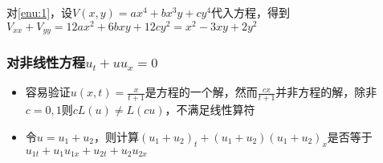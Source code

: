 对\ref{enu:1}，设\(V(x,y)=ax^4+bx^3y+cy^4\)代入方程，得到\(V_{xx}+V_{yy}=12ax^2+6bxy+12cy^2=x^2-3xy+2y^2\)

\subsubsection{对非线性方程\(u_t+uu_x=0\)}
\begin{itemize}
	\item 容易验证\(u(x,t)=\frac{x}{t+1}\)是方程的一个解，然而\(\frac{cx}{t+1}\)并非方程的解，除非\(c=0,1\)则\(cL(u)\neq L(cu)\)，不满足线性算符
	\item 令\(u=u_1+u_2\)，则计算\((u_1+u_2)_t+(u_1+u_2)(u_1+u_2)_x\)是否等于\(u_{1t}+u_1u_{1x}+u_{2t}+u_2u_{2x}\)
\end{itemize}